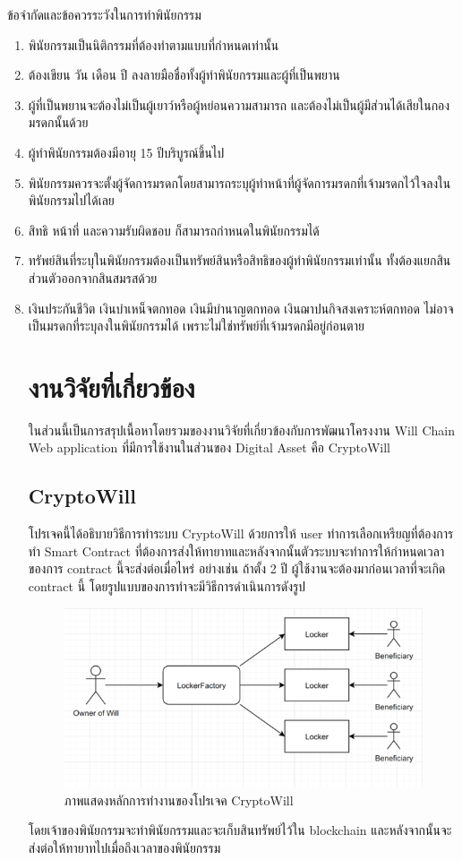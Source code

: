 \documentclass[12pt,oneside,openright,a4paper]{cpe-thai-project}
\begin{document}
ข้อจำกัดและข้อควรระวังในการทำพินัยกรรม
\begin{enumerate}[label=\arabic*.,leftmargin=0pt,itemindent=2.5cm]
\item พินัยกรรมเป็นนิติกรรมที่ต้องทำตามแบบที่กำหนดเท่านั้น
\item ต้องเขียน วัน เดือน ปี ลงลายมือชื่อทั้งผู้ทำพินัยกรรมและผู้ที่เป็นพยาน
\item ผู้ที่เป็นพยานจะต้องไม่เป็นผู้เยาว์หรือผู้หย่อนความสามารถ และต้องไม่เป็นผู้มีส่วนได้เสียในกองมรดกนั้นด้วย
\item ผู้ทำพินัยกรรมต้องมีอายุ 15 ปีบริบูรณ์ขึ้นไป
\item พินัยกรรมควรจะตั้งผู้จัดการมรดกโดยสามารถระบุผู้ทำหน้าที่ผู้จัดการมรดกที่เจ้ามรดกไว้ใจลงในพินัยกรรมไปได้เลย
\item สิทธิ หน้าที่ และความรับผิดชอบ ก็สามารถกำหนดในพินัยกรรมได้
\item ทรัพย์สินที่ระบุในพินัยกรรมต้องเป็นทรัพย์สินหรือสิทธิของผู้ทำพินัยกรรมเท่านั้น ทั้งต้องแยกสินส่วนตัวออกจากสินสมรสด้วย
\item เงินประกันชีวิต เงินบำเหน็จตกทอด เงินมีบำนาญตกทอด เงินฌาปนกิจสงเคราะห์ตกทอด ไม่อาจเป็นมรดกที่ระบุลงในพินัยกรรมได้ เพราะไม่ใช่ทรัพย์ที่เจ้ามรดกมีอยู่ก่อนตาย

\section{งานวิจัยที่เกี่ยวข้อง}
\tab ในส่วนนี้เป็นการสรุปเนื้อหาโดยรวมของงานวิจัยที่เกี่ยวข้องกับการพัฒนาโครงงาน Will Chain Web application ที่มีการใช้งานในส่วนของ Digital Asset คือ CryptoWill
\subsection{CryptoWill  \cite{cryptowill}}
\tab โปรเจคนี้ได้อธิบายวิธีการทำระบบ CryptoWill ด้วยการให้ user ทำการเลือกเหรียญที่ต้องการทำ Smart Contract ที่ต้องการส่งให้ทายาทและหลังจากนั้นตัวระบบจะทำการให้กำหนดเวลาของการ contract นี้จะส่งต่อเมื่อไหร่ อย่างเช่น ถ้าตั้ง 2 ปี ผู้ใช้งานจะต้องมาก่อนเวลาที่จะเกิด contract นี้ โดยรูปแบบของการทำจะมีวิธีการดำเนินการดังรูป

\begin{figure}[h]
	\centering
	\includegraphics[scale=0.6]{CryptoWill}
	\caption{ภาพแสดงหลักการทำงานของโปรเจค CryptoWill}
\end{figure}

โดยเจ้าของพินัยกรรมจะทำพินัยกรรมและจะเก็บสินทรัพย์ไว้ใน blockchain และหลังจากนั้นจะส่งต่อให้ทายาทไปเมื่อถึงเวลาของพินัยกรรม
\end{enumerate}
\end{document}
